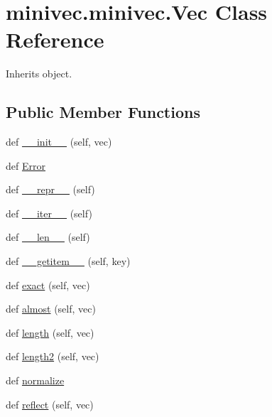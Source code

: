 \hypertarget{classminivec_1_1minivec_1_1_vec}{}\section{minivec.\+minivec.\+Vec Class Reference}
\label{classminivec_1_1minivec_1_1_vec}


Inherits object.

\subsection*{Public Member Functions}
\begin{DoxyCompactItemize}
\item 
def \hyperlink{classminivec_1_1minivec_1_1_vec_a4c2c0865dc203579c270a0cc58d9eb39}{\+\_\+\+\_\+init\+\_\+\+\_\+} (self, vec)
\item 
def \hyperlink{classminivec_1_1minivec_1_1_vec_aa97b731d40eca557a4c325d4678b2f7c}{Error}
\item 
def \hyperlink{classminivec_1_1minivec_1_1_vec_a8b513799d2c6926e09989b0c25365cb8}{\+\_\+\+\_\+repr\+\_\+\+\_\+} (self)
\item 
def \hyperlink{classminivec_1_1minivec_1_1_vec_ace2b8ef3008f5499d4a823a1e8c3b893}{\+\_\+\+\_\+iter\+\_\+\+\_\+} (self)
\item 
def \hyperlink{classminivec_1_1minivec_1_1_vec_ac4520965b2684c281fea32aa004f853e}{\+\_\+\+\_\+len\+\_\+\+\_\+} (self)
\item 
def \hyperlink{classminivec_1_1minivec_1_1_vec_a73f13171f6bf65f6883eed6b41443186}{\+\_\+\+\_\+getitem\+\_\+\+\_\+} (self, key)
\item 
def \hyperlink{classminivec_1_1minivec_1_1_vec_a5982c7bfb6f16755c3ed1a236800ab6e}{exact} (self, vec)
\item 
def \hyperlink{classminivec_1_1minivec_1_1_vec_acf9ecce0bb0d81440115c8d7c1e56910}{almost} (self, vec)
\item 
def \hyperlink{classminivec_1_1minivec_1_1_vec_ad61ccbe3ada89322c315406699b59517}{length} (self, vec)
\item 
def \hyperlink{classminivec_1_1minivec_1_1_vec_a71c1a5133bf7ec08d78abdb865a8fedc}{length2} (self, vec)
\item 
def \hyperlink{classminivec_1_1minivec_1_1_vec_a46468d59979725bfd60926ac1b3e8298}{normalize}
\item 
def \hyperlink{classminivec_1_1minivec_1_1_vec_ac1c9841ef2b35a601ae8dce1a3899406}{reflect} (self, vec)
\item 

\end{DoxyCompactItemize}
